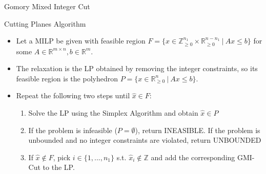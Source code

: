 \begin{frame}{Gomory Mixed Integer Cut}



\end{frame}

\begin{frame}{Cutting Planes Algorithm}
\begin{itemize}
\item Let a MILP be given with feasible region $F = \{x \in \mathbb{Z}_{\geq 0}^{n_1} \times \mathbb{R}_{\geq 0}^{n-n_1} \:\vert\: Ax \leq b \}$ for some $A \in \mathbb{R}^{m \times n}, b \in \mathbb{R}^m$.
\item The relaxation is the LP obtained by removing the integer constraints, so its feasible region is the polyhedron $P = \{x \in \mathbb{R}_{\geq 0}^{n} \:\vert\: Ax \leq b \}$.
\item Repeat the following two steps until $\hat{x} \in F$:
\begin{enumerate}
\item Solve the LP using the Simplex Algorithm and obtain $\hat{x} \in P$
\item If the problem is infeasible ($P = \emptyset$), return INEASIBLE. If the problem is unbounded and no integer constraints are violated, return UNBOUNDED
\item If $\hat{x} \notin F$, pick $i \in \{1,...,n_1\}$ s.t. $\hat{x}_i \notin \mathbb{Z}$ and add the corresponding GMI-Cut to the LP.
\end{enumerate}
\end{itemize}
\end{frame}

